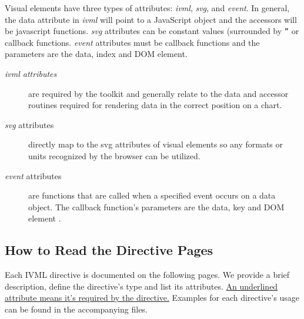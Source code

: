 \documentclass[a4paper,10pt-]{article}
\begin{document}
Visual elements have three types of attributes: \emph{ivml}, \emph{svg}, and \emph{event}. In general, the data attribute in \emph{ivml} will point to a JavaScript object and the accessors will be javascript functions. \emph{svg} attributes can be constant values (surrounded by {\tt ''} or callback functions. \emph{event} attributes must be callback functions and the parameters are the data, index and DOM element. 

\begin{description}
\item[\emph{ivml attributes}]{are required by the toolkit and generally relate to the data and accessor routines required for rendering data in the correct position on a chart. }

\item[\emph{svg} attributes]{directly map to the svg attributes of visual elements so any formats or units recognized by the browser can be utilized.}

\item[\emph{event} attributes]{are functions that are called when a specified event occurs on a data object. The callback function's parameters are the data, key and DOM element .}

\end{description}

\subsection{How to Read the Directive Pages}

Each IVML directive is documented on the following pages. We provide a brief description, define the directive's type and list its attributes. \uline{An underlined attribute means it's required by the directive.} Examples for each directive's usage can be found in the accompanying files.


\end{document}
